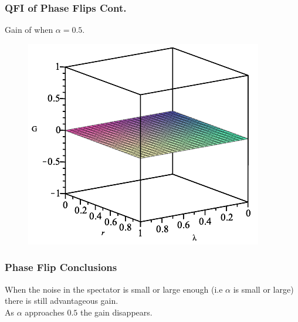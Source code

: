 \documentclass{beamer}
\begin{document}
\begin{frame}
\frametitle{QFI of Phase Flips Cont.}
Gain of when $\alpha=0.5$.
\begin{figure}
\begin{center}
\includegraphics[width=0.75\linewidth]{Phase-Flip-Two-Channel-Alpha=05-Gain.png}
\end{center}
\end{figure}
\end{frame}
\begin{frame}
\frametitle{Phase Flip Conclusions}
When the noise in the spectator is small or large enough (i.e $\alpha$ is small or large) there is still advantageous gain. \\
\vspace{10pt}
As $\alpha$ approaches $0.5$ the gain disappears.
\end{frame}
\end{document}

